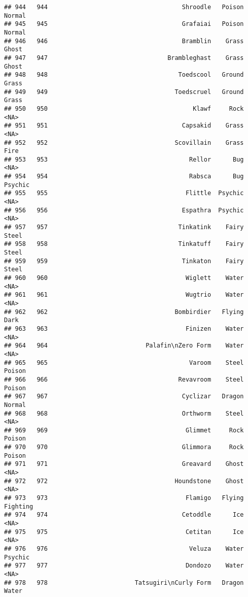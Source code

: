 \documentclass[
]{article}
\begin{document}
\begin{verbatim}
## 944   944                                     Shroodle   Poison   Normal
## 945   945                                     Grafaiai   Poison   Normal
## 946   946                                     Bramblin    Grass    Ghost
## 947   947                                 Brambleghast    Grass    Ghost
## 948   948                                    Toedscool   Ground    Grass
## 949   949                                   Toedscruel   Ground    Grass
## 950   950                                        Klawf     Rock     <NA>
## 951   951                                     Capsakid    Grass     <NA>
## 952   952                                   Scovillain    Grass     Fire
## 953   953                                       Rellor      Bug     <NA>
## 954   954                                       Rabsca      Bug  Psychic
## 955   955                                      Flittle  Psychic     <NA>
## 956   956                                     Espathra  Psychic     <NA>
## 957   957                                    Tinkatink    Fairy    Steel
## 958   958                                    Tinkatuff    Fairy    Steel
## 959   959                                     Tinkaton    Fairy    Steel
## 960   960                                      Wiglett    Water     <NA>
## 961   961                                      Wugtrio    Water     <NA>
## 962   962                                   Bombirdier   Flying     Dark
## 963   963                                      Finizen    Water     <NA>
## 964   964                           Palafin\nZero Form    Water     <NA>
## 965   965                                       Varoom    Steel   Poison
## 966   966                                    Revavroom    Steel   Poison
## 967   967                                     Cyclizar   Dragon   Normal
## 968   968                                     Orthworm    Steel     <NA>
## 969   969                                      Glimmet     Rock   Poison
## 970   970                                     Glimmora     Rock   Poison
## 971   971                                     Greavard    Ghost     <NA>
## 972   972                                   Houndstone    Ghost     <NA>
## 973   973                                      Flamigo   Flying Fighting
## 974   974                                     Cetoddle      Ice     <NA>
## 975   975                                      Cetitan      Ice     <NA>
## 976   976                                       Veluza    Water  Psychic
## 977   977                                      Dondozo    Water     <NA>
## 978   978                        Tatsugiri\nCurly Form   Dragon    Water

\end{verbatim}
\end{document}
